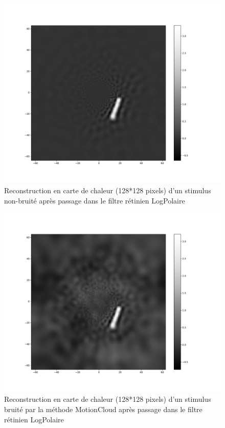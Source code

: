 \begin{figure}[th]
\centering
\includegraphics[scale=0.4]{Figures/mnist_128_LP_nonoise}
\decoRule
\caption[Figure]{Reconstruction en carte de chaleur (128*128 pixels) d'un stimulus non-bruité après passage dans le filtre rétinien LogPolaire}
\label{fig:mnist_128_LP_nonoise}
\end{figure}

\begin{figure}[th]
\centering
\includegraphics[scale=0.4]{Figures/mnist_128_LP_noise}
\decoRule
\caption[Figure]{Reconstruction en carte de chaleur (128*128 pixels) d'un stimulus bruité par la méthode MotionCloud après passage dans le filtre rétinien LogPolaire}
\label{fig:mnist_128_LP_MotionCloud}
\end{figure}

